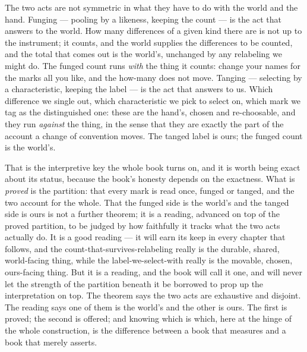 The two acts are not symmetric in what they have to do with the world and the hand. Funging --- pooling by a
likeness, keeping the count --- is the act that answers to the world. How many differences of a given kind there
are is not up to the instrument; it counts, and the world supplies the differences to be counted, and the total
that comes out is the world's, unchanged by any relabeling we might do. The funged count runs \emph{with} the
thing it counts: change your names for the marks all you like, and the how-many does not move. Tanging ---
selecting by a characteristic, keeping the label --- is the act that answers to us. Which difference we single
out, which characteristic we pick to select on, which mark we tag as the distinguished one: these are the hand's,
chosen and re-choosable, and they run \emph{against} the thing, in the sense that they are exactly the part of
the account a change of convention moves. The tanged label is ours; the funged count is the world's.

That is the interpretive key the whole book turns on, and it is worth being exact about its status, because the
book's honesty depends on the exactness. What is \emph{proved} is the partition: that every mark is read once,
funged or tanged, and the two account for the whole. That the funged side is the world's and the tanged side is
ours is not a further theorem; it is a reading, advanced on top of the proved partition, to be judged by how
faithfully it tracks what the two acts actually do. It is a good reading --- it will earn its keep in every
chapter that follows, and the count-that-survives-relabeling really is the durable, shared, world-facing thing,
while the label-we-select-with really is the movable, chosen, ours-facing thing. But it is a reading, and the
book will call it one, and will never let the strength of the partition beneath it be borrowed to prop up the
interpretation on top. The theorem says the two acts are exhaustive and disjoint. The reading says one of them is
the world's and the other is ours. The first is proved; the second is offered; and knowing which is which, here
at the hinge of the whole construction, is the difference between a book that measures and a book that merely
asserts.

